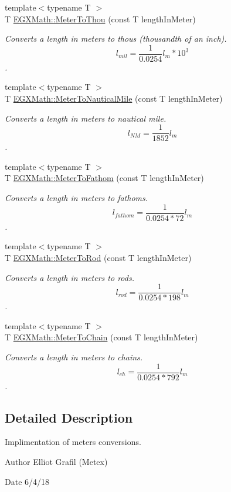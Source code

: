 \begin{DoxyCompactItemize}
{\footnotesize template$<$typename T $>$ }\\T \mbox{\hyperlink{group___e_g_x_math-_conversions-_length_conversions-_s_i-_meter-_imperial_gaebe39a6b8485aae53724390225f27a66}{E\+G\+X\+Math\+::\+Meter\+To\+Thou}} (const T length\+In\+Meter)
\begin{DoxyCompactList}\small\item\em Converts a length in meters to thous (thousandth of an inch). \[ l_{mil}= \frac{1}{0.0254} l_{m} * 10^{3} \]. \end{DoxyCompactList}\item 
{\footnotesize template$<$typename T $>$ }\\T \mbox{\hyperlink{group___e_g_x_math-_conversions-_length_conversions-_s_i-_meter-_nautical_ga501f0dd53cb3c21d377eac2a18fabdf8}{E\+G\+X\+Math\+::\+Meter\+To\+Nautical\+Mile}} (const T length\+In\+Meter)
\begin{DoxyCompactList}\small\item\em Converts a length in meters to nautical mile. \[ l_{NM}= \frac{1}{1852} l_{m} \]. \end{DoxyCompactList}\item 
{\footnotesize template$<$typename T $>$ }\\T \mbox{\hyperlink{group___e_g_x_math-_conversions-_length_conversions-_s_i-_meter-_nautical_gaa66945d01b3da25cb9d52cd15f4aa38e}{E\+G\+X\+Math\+::\+Meter\+To\+Fathom}} (const T length\+In\+Meter)
\begin{DoxyCompactList}\small\item\em Converts a length in meters to fathoms. \[ l_{fathom}= \frac{1}{0.0254 * 72} l_{m} \]. \end{DoxyCompactList}\item 
{\footnotesize template$<$typename T $>$ }\\T \mbox{\hyperlink{group___e_g_x_math-_conversions-_length_conversions-_s_i-_meter-_surveyors_ga45c89e4e6dd1d1e3f2a6c4f4a1051543}{E\+G\+X\+Math\+::\+Meter\+To\+Rod}} (const T length\+In\+Meter)
\begin{DoxyCompactList}\small\item\em Converts a length in meters to rods. \[ l_{rod}= \frac{1}{0.0254 * 198} l_{m} \]. \end{DoxyCompactList}\item 
{\footnotesize template$<$typename T $>$ }\\T \mbox{\hyperlink{group___e_g_x_math-_conversions-_length_conversions-_s_i-_meter-_surveyors_ga67b4e6d6a387e3da5f93fd32b5d17764}{E\+G\+X\+Math\+::\+Meter\+To\+Chain}} (const T length\+In\+Meter)
\begin{DoxyCompactList}\small\item\em Converts a length in meters to chains. \[ l_{ch}= \frac{1}{0.0254 * 792} l_{m} \]. \end{DoxyCompactList}\end{DoxyCompactItemize}


\subsection{Detailed Description}
Implimentation of meters conversions. 

\begin{DoxyAuthor}{Author}
Elliot Grafil (Metex) 
\end{DoxyAuthor}
\begin{DoxyDate}{Date}
6/4/18 
\end{DoxyDate}
